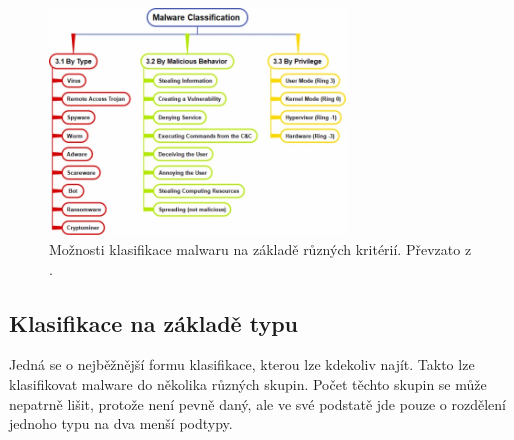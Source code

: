 \begin{figure}[h]
	\centering
        \includegraphics[width=0.7\textwidth]{obrazky/classification.png}
	\caption{Možnosti klasifikace malwaru na základě různých kritérií. Převzato z \cite{article_malware}.}
    \label{classific}
\end{figure}
\newpage
\subsection*{Klasifikace na základě typu}
Jedná se o nejběžnější formu klasifikace, kterou lze kdekoliv najít. Takto lze klasifikovat malware do několika různých skupin. Počet těchto skupin se může nepatrně lišit, protože není pevně daný, ale ve své podstatě jde 
pouze o rozdělení jednoho typu na dva menší podtypy. 

